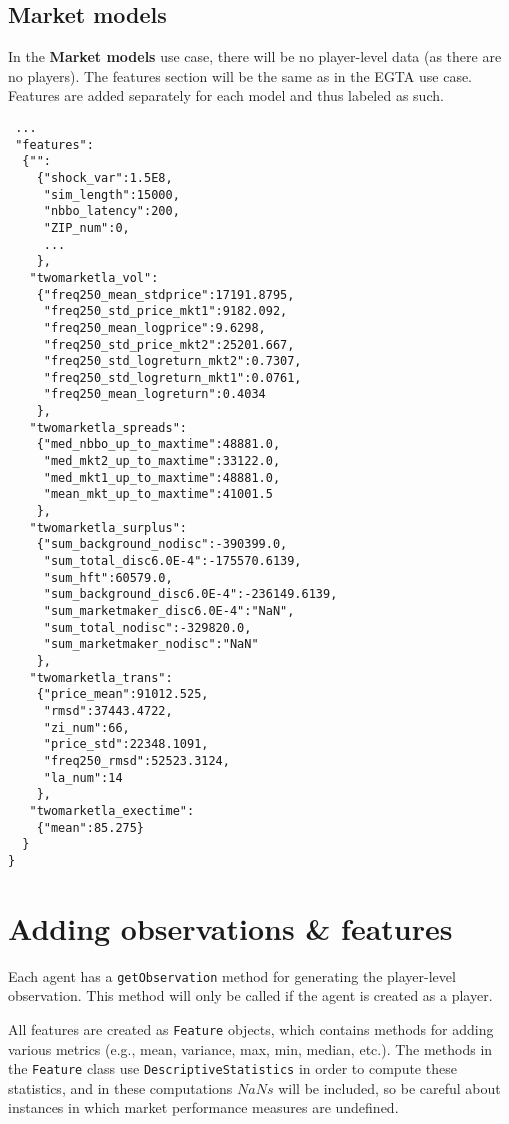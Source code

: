 \documentclass[11pt]{article}
\begin{document}
\subsection{Market models}

In the \textbf{Market models} use case, there will be no player-level data (as there are no players). The features section will be the same as in the EGTA use case.
Features are added separately for each model and thus labeled as such.

\begin{verbatim}
 ...
 "features":
  {"":
    {"shock_var":1.5E8,
     "sim_length":15000,
     "nbbo_latency":200,
     "ZIP_num":0,
     ...
    },
   "twomarketla_vol":
    {"freq250_mean_stdprice":17191.8795,
     "freq250_std_price_mkt1":9182.092,
     "freq250_mean_logprice":9.6298,
     "freq250_std_price_mkt2":25201.667,
     "freq250_std_logreturn_mkt2":0.7307,
     "freq250_std_logreturn_mkt1":0.0761,
     "freq250_mean_logreturn":0.4034
    },
   "twomarketla_spreads":
    {"med_nbbo_up_to_maxtime":48881.0,
     "med_mkt2_up_to_maxtime":33122.0,
     "med_mkt1_up_to_maxtime":48881.0,
     "mean_mkt_up_to_maxtime":41001.5
    },
   "twomarketla_surplus":
    {"sum_background_nodisc":-390399.0,
     "sum_total_disc6.0E-4":-175570.6139,
     "sum_hft":60579.0,
     "sum_background_disc6.0E-4":-236149.6139,
     "sum_marketmaker_disc6.0E-4":"NaN",
     "sum_total_nodisc":-329820.0,
     "sum_marketmaker_nodisc":"NaN"
    },
   "twomarketla_trans":
    {"price_mean":91012.525,
     "rmsd":37443.4722,
     "zi_num":66,
     "price_std":22348.1091,
     "freq250_rmsd":52523.3124,
     "la_num":14
    },
   "twomarketla_exectime":
    {"mean":85.275}
  }
}

\end{verbatim}


\section{Adding observations \& features}

Each agent has a \verb|getObservation| method for generating the player-level observation. This method will only be called if the agent is created as a player.

All features are created as \verb|Feature| objects, which contains methods for adding various metrics (e.g., mean, variance, max, min, median, etc.).
The methods in the \verb|Feature| class use \verb|DescriptiveStatistics| in order to compute these statistics, and in these computations $NaNs$ will be included, so be careful about instances in which market performance measures are undefined.
\end{document}
